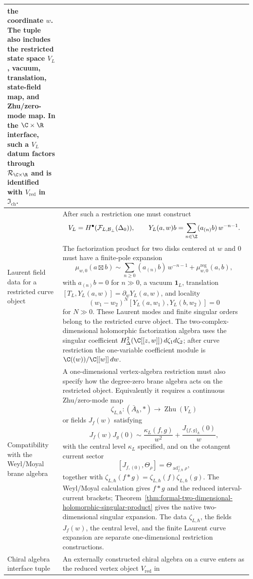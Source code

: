 \begin{longtable}{@{}>{\raggedright\arraybackslash}p{}
  >{\raggedright\arraybackslash}p{}@{}}
the coordinate \(w\).  The tuple also includes the restricted state
space \(V_L\), vacuum, translation, state-field map, and Zhu/zero-mode
map.  In the \(\C\times\R\) interface, such a \(V_L\) datum factors through
\(\mathcal R_{\C\times\R}\) and is identified with
\(V_{\mathrm{red}}\) in \(\mathfrak I_{\mathrm{ch}}\).\\
\hline
Laurent field data for a restricted curve object &
After such a restriction one must construct
\[
  V_L=H^\bullet(\mathcal F_{L,\mathcal B_\perp}(\Delta_0)),
  \qquad
  Y_L(a,w)b=\sum_{n\in\Z}(a_{(n)}b)\,w^{-n-1}.
\]
The factorization product for two disks centered at \(w\) and \(0\) must
have a finite-pole expansion
\[
  \mu_{w,0}(a\boxtimes b)
  \sim
  \sum_{n\ge0}(a_{(n)}b)\,w^{-n-1}
  +\mu^{\mathrm{reg}}_{w,0}(a,b),
\]
with \(a_{(n)}b=0\) for \(n\gg0\), a vacuum
\(\mathbf 1_L\), translation
\([T_L,Y_L(a,w)]=\partial_wY_L(a,w)\), and locality
\[
  (w_1-w_2)^N
  [Y_L(a,w_1),Y_L(b,w_2)]=0
\]
for \(N\gg0\).  These Laurent modes and finite singular orders belong
to the restricted curve object.  The two-complex-dimensional
holomorphic factorization algebra uses the singular coefficient
\(H^2_\Delta(\C[[z,w]])\,d\zeta_1d\zeta_2\); after curve restriction the
one-variable coefficient module is \(\C((w))/\C[[w]]\,dw\).\\
\hline
Compatibility with the Weyl/Moyal brane algebra &
A one-dimensional vertex-algebra restriction must also specify how the
degree-zero brane algebra acts on the restricted object.  Equivalently it
requires a continuous Zhu/zero-mode map
\[
  \zeta_{L,\hbar}\colon
  (\bar A_\hbar,*)\longrightarrow \operatorname{Zhu}(V_L)
\]
or fields \(J_f(w)\) satisfying
\[
  J_f(w)J_g(0)
  \sim
  \frac{\kappa_L(f,g)}{w^2}
  +
  \frac{J_{\{f,g\}_\hbar}(0)}{w},
\]
with the central level \(\kappa_L\) specified, and on the cotangent
current sector
\[
  [J_{f,(0)},\Theta_\rho]
  =
  \Theta_{\operatorname{ad}^{\vee}_{f,\hbar}\rho},
\]
together with
\(\zeta_{L,\hbar}(f*g)=\zeta_{L,\hbar}(f)\zeta_{L,\hbar}(g)\).
The Weyl/Moyal calculation gives \(f*g\) and the reduced
interval-current brackets; Theorem~\ref{thm:formal-two-dimensional-holomorphic-singular-product}
gives the native two-dimensional singular expansion.  The data
\(\zeta_{L,\hbar}\), the fields \(J_f(w)\), the central level, and the
finite Laurent curve expansion are separate one-dimensional restriction
constructions.\\
\hline
Chiral algebra interface tuple &
An externally constructed chiral algebra on a curve enters as the reduced
vertex object \(V_{\mathrm{red}}\) in

\end{longtable}
